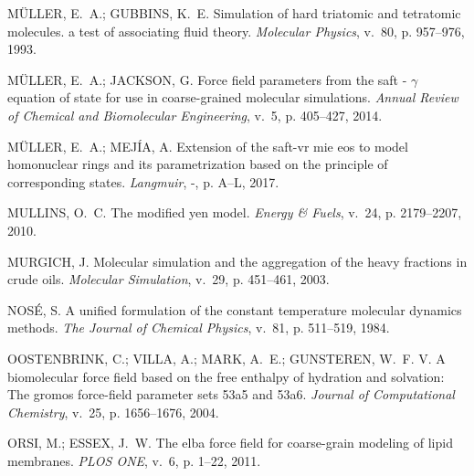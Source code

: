 \documentclass[
	12pt,				%
	openany,			%
	oneside,			%
	a4paper,			%
	english,			%
	brazil				%
	]{abntex2}
\begin{document}
\begin{thebibliography}{}
{M\"ULLER, E.~A.; GUBBINS, K.~E. Simulation of hard triatomic and tetratomic
  molecules. a test of associating fluid theory.
\emph{Molecular Physics}, v.~80, p. 957–976, 1993.}

{M\"ULLER, E.~A.; JACKSON, G. Force field parameters from the saft - $\gamma$
  equation of state for use in coarse-grained molecular simulations.
\emph{Annual Review of Chemical and Biomolecular Engineering}, v.~5, p.
  405--427, 2014.}

{M\"ULLER, E.~A.; MEJ\'IA, A. Extension of the saft-vr mie eos to model
  homonuclear rings and its parametrization based on the principle of
  corresponding states.
\emph{Langmuir}, -, p. A–L, 2017.}

{MULLINS, O.~C. The modified yen model.
\emph{Energy \& Fuels}, v.~24, p. 2179--2207, 2010.}

{MURGICH, J. Molecular simulation and the aggregation of the heavy fractions in
  crude oils.
\emph{Molecular Simulation}, v.~29, p. 451--461, 2003.}

{NOS\'E, S. A unified formulation of the constant temperature molecular
  dynamics methods.
\emph{The Journal of Chemical Physics}, v.~81, p. 511--519, 1984.}

{OOSTENBRINK, C.; VILLA, A.; MARK, A.~E.; GUNSTEREN, W.~F. V. A biomolecular
  force field based on the free enthalpy of hydration and solvation: The gromos
  force-field parameter sets 53a5 and 53a6.
\emph{Journal of Computational Chemistry}, v.~25, p. 1656--1676, 2004.}

{ORSI, M.; ESSEX, J.~W. The elba force field for coarse-grain modeling of lipid
  membranes.
\emph{PLOS ONE}, v.~6, p. 1--22, 2011.}


\end{thebibliography}
\end{document}

